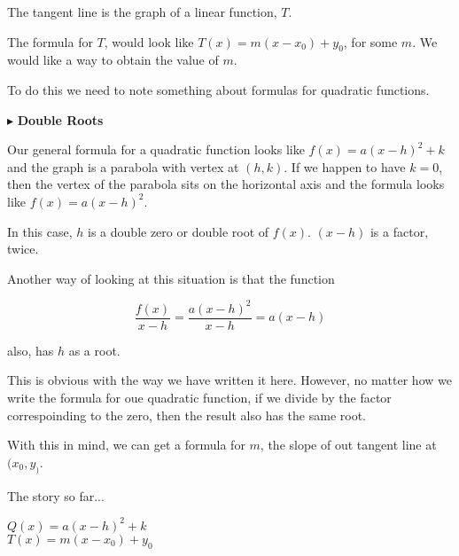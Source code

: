 \documentclass{ximera}
\begin{document}
The tangent line is the graph of a linear function, $T$.


The formula for $T$, would look like $T(x) = m(x - x_0) + y_0$, for some $m$.  We would like a way to obtain the value of $m$.


To do this we need to note something about formulas for quadratic functions.


$\blacktriangleright$ \textbf{Double Roots}

Our general formula for a quadratic function looks like  $f(x) = a (x - h)^2 + k$ and the graph is a parabola with vertex at $(h, k)$. If we happen to have $k = 0$, then the vertex of the parabola sits on the horizontal axis and the formula looks like $f(x) = a (x - h)^2$.


In this case, $h$ is a double zero or double root of $f(x)$.  $(x - h)$ is a factor, twice.


Another way of looking at this situation is that the function


\[
\frac{f(x)}{x-h} = \frac{a (x - h)^2}{x - h} = a (x - h)
\]


also, has $h$ as a root.

This is obvious with the way we have written it here.  However, no matter how we write the formula for oue quadratic function, if we divide by the factor correspoinding to the zero, then the result also has the same root.


With this in mind, we can get a formula for $m$, the slope of out tangent line at $(x_0, y_)$.






The story so far...

$Q(x) = a (x - h)^2 + k$ \\

$T(x) = m(x - x_0) + y_0$ \\
\end{document}
